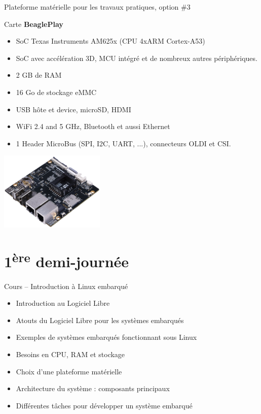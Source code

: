 \documentclass[a4paper,12pt,obeyspaces,spaces,hyphens]{article}
\begin{document}
\feagendatwocolumn
{Plateforme matérielle pour les travaux pratiques, option \#3}
{
  Carte {\bf BeaglePlay}
  \begin{itemize}
    \item SoC Texas Instruments AM625x (CPU 4xARM Cortex-A53)
    \item SoC avec accélération 3D, MCU intégré et de nombreux autres périphériques.
    \item 2 GB de RAM
    \item 16 Go de stockage eMMC
    \item USB hôte et device, microSD, HDMI
    \item WiFi 2.4 and 5 GHz, Bluetooth et aussi Ethernet
    \item 1 Header MicroBus (SPI, I2C, UART, ...), connecteurs OLDI et CSI.
  \end{itemize}
}
{}
{
  \begin{center}
    \includegraphics[width=5cm]{../slides/beagleplay-board/beagleplay.png}
  \end{center}
}

\section{1\textsuperscript{ère} demi-journée}

\feagendaonecolumn
{Cours – Introduction à Linux embarqué}
{
  \begin{itemize}
  \item Introduction au Logiciel Libre
  \item Atouts du Logiciel Libre pour les systèmes embarqués
  \item Exemples de systèmes embarqués fonctionnant sous Linux
  \item Besoins en CPU, RAM et stockage
  \item Choix d'une plateforme matérielle
  \item Architecture du système : composants principaux
  \item Différentes tâches pour développer un système embarqué
  \end{itemize}
}
\end{document}
